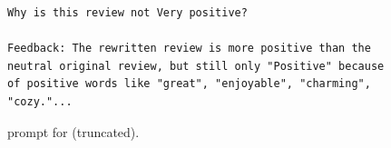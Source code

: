 \begin{figure}
\begin{small}
\begin{verbatim}
Why is this review not Very positive?

Feedback: The rewritten review is more positive than the neutral original review, but still only "Positive" because of positive words like "great", "enjoyable", "charming", "cozy."...
\end{verbatim}
\end{small}
\caption{\fbmod prompt for \sentxfer (truncated).}
    \label{fig:prompt:sentiment:fb}
\end{figure}

